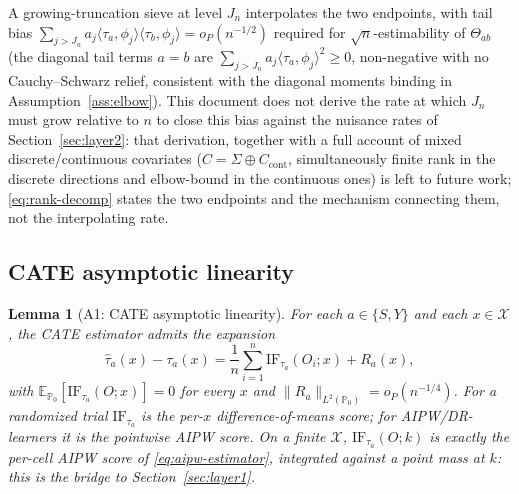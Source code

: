 \documentclass[11pt]{article}
\theoremstyle{plain}
\newtheorem{lemma}[theorem]{Lemma}
\theoremstyle{definition}
\theoremstyle{remark}
\newcommand{\E}{\mathbb{E}}
\newcommand{\PP}{\mathbb{P}}
\newcommand{\cX}{\mathcal{X}}
\newcommand{\IF}{\mathrm{IF}}
\begin{document}
A growing-truncation sieve at level $J_n$ interpolates the two endpoints, with tail
bias $\sum_{j>J_n}a_j\langle\tau_a,\phi_j\rangle\langle\tau_b,\phi_j\rangle=o_P(n^{-1/2})$
required for $\sqrt n$-estimability of $\Theta_{ab}$ (the diagonal tail terms $a=b$
are $\sum_{j>J_n}a_j\langle\tau_a,\phi_j\rangle^2\ge0$, non-negative with no
Cauchy--Schwarz relief, consistent with the diagonal moments binding in
Assumption~\ref{ass:elbow}). This document does not derive the rate at which $J_n$
must grow relative to $n$ to close this bias against the nuisance rates of
Section~\ref{sec:layer2}: that derivation, together with a full account of mixed
discrete/continuous covariates ($C=\Sigma\oplus C_{\mathrm{cont}}$, simultaneously
finite rank in the discrete directions and elbow-bound in the continuous ones) is
left to future work; \eqref{eq:rank-decomp} states the two endpoints and the
mechanism connecting them, not the interpolating rate.

\subsection{CATE asymptotic linearity}

\begin{lemma}[A1: CATE asymptotic linearity]\label{lem:cate-linearity}
For each $a\in\{S,Y\}$ and each $x\in\cX$, the CATE estimator admits the expansion
\begin{equation}\label{eq:cate-expansion}
    \hat\tau_a(x)-\tau_a(x) = \frac1n\sum_{i=1}^n\IF_{\tau_a}(O_i;x) + R_a(x),
\end{equation}
with $\E_{\PP_0}[\IF_{\tau_a}(O;x)]=0$ for every $x$ and
$\|R_a\|_{L^2(\PP_0)}=o_P(n^{-1/4})$. For a randomized trial $\IF_{\tau_a}$ is the
per-$x$ difference-of-means score; for AIPW/DR-learners it is the pointwise AIPW
score. On a finite $\cX$, $\IF_{\tau_a}(O;k)$ is exactly the per-cell AIPW score of
\eqref{eq:aipw-estimator}, integrated against a point mass at $k$: this is the bridge
to Section~\ref{sec:layer1}.
\end{lemma}
\end{document}
